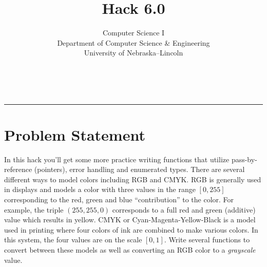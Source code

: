 \documentclass[12pt]{scrartcl}
\title{Hack 6.0}\let\Title\@title
\subtitle{Computer Science I\\
{\small
\vskip1cm
Department of Computer Science \& Engineering \\
University of Nebraska--Lincoln}
\vskip-1cm}
\date{~}
\begin{document}
\maketitle

\hrule



\section*{Problem Statement}

In this hack you'll get some more practice writing functions that utilize 
pass-by-reference (pointers), error handling and enumerated types.  There 
are several different
ways to model colors including RGB and CMYK.  RGB is generally used in displays
and models a color with three values in the range $[0, 255]$ corresponding to 
the red, green and blue ``contribution'' to the color.  For example, the
triple $(255, 255, 0)$ corresponds to a full red and green (additive) value
which results in yellow.  CMYK or Cyan-Magenta-Yellow-Black is a model used
in printing where four colors of ink are combined to make various colors.
In this system, the four values are on the scale $[0, 1]$.  Write several
functions to convert between these models as well as converting an RGB
color to a \emph{grayscale} value.
\end{document}
